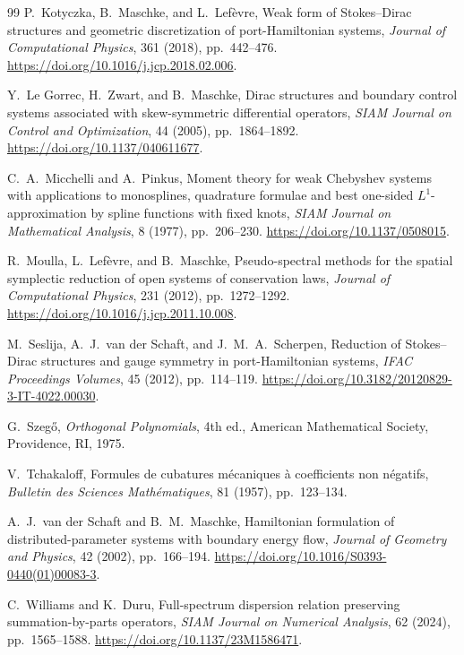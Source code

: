 \documentclass[11pt,a4paper]{article}
\theoremstyle{definition}
\theoremstyle{remark}
\begin{document}
\begin{thebibliography}{99}
P.~Kotyczka, B.~Maschke, and L.~Lef\`evre,
\newblock Weak form of Stokes--Dirac structures and geometric discretization of
port-Hamiltonian systems,
\newblock \emph{Journal of Computational Physics}, 361 (2018), pp.~442--476.
\newblock \url{https://doi.org/10.1016/j.jcp.2018.02.006}.

Y.~Le Gorrec, H.~Zwart, and B.~Maschke,
\newblock Dirac structures and boundary control systems associated with skew-symmetric differential operators,
\newblock \emph{SIAM Journal on Control and Optimization}, 44 (2005), pp.~1864--1892.
\newblock \url{https://doi.org/10.1137/040611677}.

C.~A.~Micchelli and A.~Pinkus,
\newblock Moment theory for weak Chebyshev systems with applications to monosplines,
quadrature formulae and best one-sided $L^1$-approximation by spline functions with fixed
knots,
\newblock \emph{SIAM Journal on Mathematical Analysis}, 8 (1977), pp.~206--230.
\newblock \url{https://doi.org/10.1137/0508015}.

R.~Moulla, L.~Lef\`evre, and B.~Maschke,
\newblock Pseudo-spectral methods for the spatial symplectic reduction of open systems of conservation laws,
\newblock \emph{Journal of Computational Physics}, 231 (2012), pp.~1272--1292.
\newblock \url{https://doi.org/10.1016/j.jcp.2011.10.008}.

M.~Seslija, A.~J.~van der Schaft, and J.~M.~A.~Scherpen,
\newblock Reduction of Stokes--Dirac structures and gauge symmetry in port-Hamiltonian systems,
\newblock \emph{IFAC Proceedings Volumes}, 45 (2012), pp.~114--119.
\newblock \url{https://doi.org/10.3182/20120829-3-IT-4022.00030}.

G.~Szeg\H{o},
\newblock \emph{Orthogonal Polynomials}, 4th ed.,
\newblock American Mathematical Society, Providence, RI, 1975.

V.~Tchakaloff,
\newblock Formules de cubatures m\'ecaniques \`a coefficients non n\'egatifs,
\newblock \emph{Bulletin des Sciences Math\'ematiques}, 81 (1957), pp.~123--134.

A.~J.~van der Schaft and B.~M.~Maschke,
\newblock Hamiltonian formulation of distributed-parameter systems with boundary energy flow,
\newblock \emph{Journal of Geometry and Physics}, 42 (2002), pp.~166--194.
\newblock \url{https://doi.org/10.1016/S0393-0440(01)00083-3}.

C.~Williams and K.~Duru,
\newblock Full-spectrum dispersion relation preserving summation-by-parts operators,
\newblock \emph{SIAM Journal on Numerical Analysis}, 62 (2024), pp.~1565--1588.
\newblock \url{https://doi.org/10.1137/23M1586471}.

\end{thebibliography}
\end{document}
